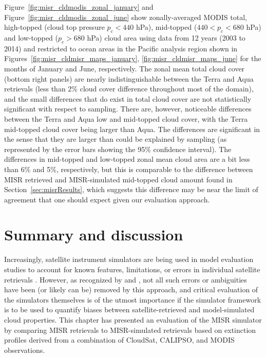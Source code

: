 Figure~\ref{fig:misr_cldmodis_zonal_january} and
Figure~\ref{fig:misr_cldmodis_zonal_june} show zonally-averaged MODIS
total, high-topped (cloud top pressure \(p_c < 440\) hPa), mid-topped
(\(440 < p_c < 680\) hPa) and low-topped (\(p_c > 680\) hPa) cloud area
using data from 12 years (2003 to 2014) and restricted to ocean areas in
the Pacific analysis region shown in
Figures~\ref{fig:misr_cldmisr_maps_january}, \ref{fig:misr_cldmisr_maps_june}
for the months of January and June, respectively. The zonal mean total
cloud cover (bottom right panels) are nearly indistinguishable between
the Terra and Aqua retrievals (less than 2\% cloud cover difference
throughout most of the domain), and the small differences that do exist
in total cloud cover are not statistically significant with respect to
sampling. There are, however, noticeable differences between the Terra
and Aqua low and mid-topped cloud cover, with the Terra mid-topped cloud
cover being larger than Aqua. The differences are significant in the
sense that they are larger than could be explained by sampling (as
represented by the error bars showing the 95\% confidence interval). The
differences in mid-topped and low-topped zonal mean cloud area are a bit
less than 6\% and 5\%, respectively, but this is comparable to the
difference between MISR retrieved and MISR-simulated mid-topped cloud
amount found in Section~\ref{sec:misrResults}, which suggests this
difference may be near the limit of agreement that one should expect
given our evaluation approach.

\section{Summary and discussion}\label{sec:misrSummary}

Increasingly, satellite instrument simulators are being used in model
evaluation studies to account for known features, limitations, or errors
in individual satellite retrievals \citep{webb_et_al_2016}. However, as
recognized by \citet{pincus_et_al_2012} and \citet{mace_et_al_2011}, not
all such errors or ambiguities have been (or likely can be) removed by
this approach, and critical evaluation of the simulators themselves is
of the utmost importance if the simulator framework is to be used to
quantify biases between satellite-retrieved and model-simulated cloud
properties. This chapter has presented an evaluation of the MISR
simulator by comparing MISR retrievals to MISR-simulated retrievals
based on extinction profiles derived from a combination of CloudSat,
CALIPSO, and MODIS observations.

